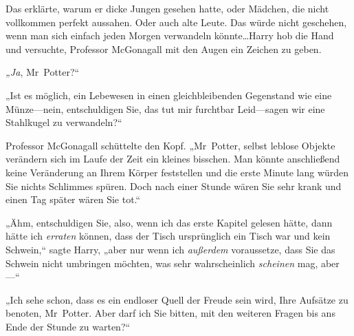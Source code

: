 Das erklärte, warum er dicke Jungen gesehen hatte, oder Mädchen, die nicht vollkommen perfekt aussahen. Oder auch alte Leute. Das würde nicht geschehen, wenn man sich einfach jeden Morgen verwandeln könnte…Harry hob die Hand und versuchte, Professor McGonagall mit den Augen ein Zeichen zu geben.

\emph{„Ja}, Mr~Potter?“

„Ist es möglich, ein Lebewesen in einen gleichbleibenden Gegenstand wie eine Münze—nein, entschuldigen Sie, das tut mir furchtbar Leid—sagen wir eine Stahlkugel zu verwandeln?“

Professor McGonagall schüttelte den Kopf. „Mr~Potter, selbst leblose Objekte verändern sich im Laufe der Zeit ein kleines bisschen. Man könnte anschließend keine Veränderung an Ihrem Körper feststellen und die erste Minute lang würden Sie nichts Schlimmes spüren. Doch nach einer Stunde wären Sie sehr krank und einen Tag später wären Sie tot.“

„Ähm, entschuldigen Sie, also, wenn ich das erste Kapitel gelesen hätte, dann hätte ich \emph{erraten} können, dass der Tisch ursprünglich ein Tisch war und kein Schwein,“ sagte Harry, „aber nur wenn ich \emph{außerdem} voraussetze, dass Sie das Schwein nicht umbringen möchten, was sehr wahrscheinlich \emph{scheinen} mag, aber—“

„Ich sehe schon, dass es ein endloser Quell der Freude sein wird, Ihre Aufsätze zu benoten, Mr~Potter. Aber darf ich Sie bitten, mit den weiteren Fragen bis ans Ende der Stunde zu warten?“

